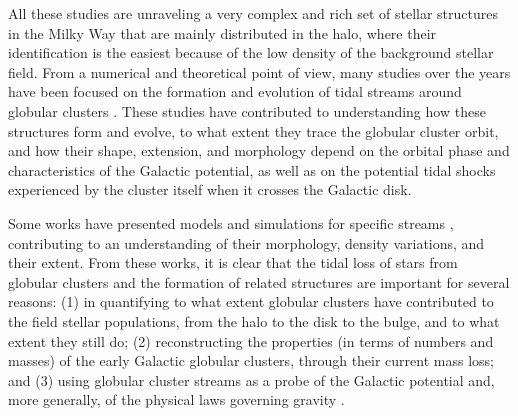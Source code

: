 All these studies are unraveling  a very complex and rich set of stellar structures in the Milky Way that are mainly distributed in the halo, where their identification is the easiest because of the low density of the background stellar field. 
From a numerical and theoretical point of view, many studies over the years have been focused on the formation and evolution of tidal streams around globular clusters \citep{1975AJ.....80..290K, 1992ApJ...386..506O, 1992ApJ...386..519O, 1998ASPC..136...45G, 1999A&A...352..149C, 2002MNRAS.332..915I, 2002ApJ...570..656J, 2002JKAS...35...75Y, 2005AJ....129.1906C, 2005CeMDA..91...59D, 2007ApJ...659.1212M, 2008ApJ...681...40S, 2010MNRAS.401..105K, 2010MNRAS.406.2732L, 2012MNRAS.420.2700K, 2012A&A...546L...7M, 2013MNRAS.433.1813S,  2014ApJ...795...95B, 2016MNRAS.463L..17A, 2016MNRAS.463..102E, 2016MNRAS.457.3817S, 2017NatAs...1..633P, 2018ApJ...861...69C,  2018A&A...609A..44T, 2020ApJ...889..107C, 2022A&A...667A.112V}. These studies have contributed to understanding how these structures form and evolve, to what extent they trace the globular cluster orbit, and how their shape, extension, and morphology depend on the orbital phase and characteristics of the Galactic potential, as well as  on the potential tidal shocks experienced by the cluster itself when it crosses the Galactic disk.


Some works have presented models and simulations for specific streams \citep{2004AJ....127.2753D, 2012A&A...546L...7M, 2019MNRAS.484.2009B, 2019ApJ...880...38B, 2021JCAP...10..043B, 2021DDA....5240106B}, contributing to an understanding of their morphology, density variations, and their extent. From these works, it is clear that the tidal loss of stars from globular clusters and the formation of related structures are important for several reasons: (1) in quantifying to what extent globular clusters have contributed to the field stellar populations, from the halo to the disk to the bulge, and to what extent they still do; (2) reconstructing the properties (in terms of numbers and masses) of the early Galactic globular clusters, through their current mass loss; and (3) using globular cluster streams as a probe of the Galactic potential and, more generally, of the physical laws governing gravity \citep[see, e.g., ][]{2018A&A...609A..44T, 2019ApJ...887L..12B, 2020PhRvD.102h4066N, 2021JCAP...10..043B}.


